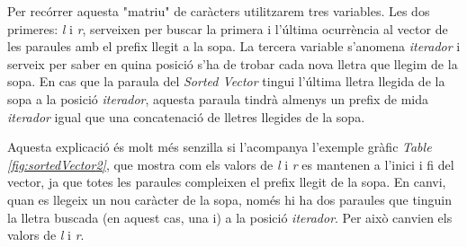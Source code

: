 \documentclass[titlepage]{article}
\begin{document}
Per recórrer aquesta "matriu" de caràcters utilitzarem tres variables. Les dos primeres: \textit{l} i \textit{r}, serveixen per buscar la primera i l'última ocurrència al vector de les paraules amb el prefix llegit a la sopa. La tercera variable s'anomena \textit{iterador} i serveix per saber en quina posició s'ha de trobar cada nova lletra que llegim de la sopa. En cas que la paraula del \textit{Sorted Vector} tingui l'última lletra llegida de la sopa a la posició \textit{iterador}, aquesta paraula tindrà almenys un prefix de mida \textit{iterador} igual que una concatenació de lletres llegides de la sopa.\newline\par
Aquesta explicació és molt més senzilla si l'acompanya l'exemple gràfic  \textit{Table \ref{fig:sortedVector2}}, que mostra com els valors de \textit{l} i \textit{r} es mantenen a l'inici i fi del vector, ja que totes les paraules compleixen el prefix llegit de la sopa. En canvi, quan es llegeix un nou caràcter de la sopa, només hi ha dos paraules que tinguin la lletra buscada (en aquest cas, una i) a la posició \textit{iterador}. Per això canvien els valors de \textit{l} i \textit{r}.\newline
\end{document}
